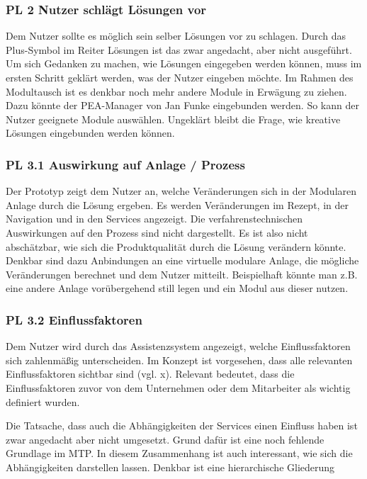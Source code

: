 \subsubsection*{PL 2 Nutzer schlägt Lösungen vor}
Dem Nutzer sollte es möglich sein selber Lösungen vor zu schlagen. Durch das Plus-Symbol im Reiter Lösungen ist das zwar angedacht, aber nicht ausgeführt. Um sich Gedanken zu machen, wie Lösungen eingegeben werden können, muss im ersten Schritt geklärt werden, was der Nutzer eingeben möchte. Im Rahmen des Modultausch ist es denkbar noch mehr andere Module in Erwägung zu ziehen. Dazu könnte der PEA-Manager von Jan Funke \cite{Funke2018} eingebunden werden. So kann der Nutzer geeignete Module auswählen. Ungeklärt bleibt die Frage, wie kreative Lösungen eingebunden werden können. 

\subsubsection*{PL 3.1 Auswirkung auf Anlage / Prozess}
Der Prototyp zeigt dem Nutzer an, welche Veränderungen sich in der Modularen Anlage durch die Lösung ergeben. Es werden Veränderungen im Rezept, in der Navigation und in den Services angezeigt. Die verfahrenstechnischen Auswirkungen auf den Prozess sind nicht dargestellt. Es ist also nicht abschätzbar, wie sich die Produktqualität durch die Lösung verändern könnte. Denkbar sind dazu Anbindungen an eine virtuelle modulare Anlage, die mögliche Veränderungen berechnet und dem Nutzer mitteilt. Beispielhaft könnte man z.B. eine andere Anlage vorübergehend still legen und ein Modul aus dieser nutzen.

\subsubsection*{PL 3.2 Einflussfaktoren}
Dem Nutzer wird durch das Assistenzsystem angezeigt, welche Einflussfaktoren sich zahlenmäßig unterscheiden. Im Konzept ist vorgesehen, dass alle relevanten Einflussfaktoren sichtbar sind (vgl. x). Relevant bedeutet, dass die Einflussfaktoren zuvor von dem Unternehmen oder dem Mitarbeiter als wichtig definiert wurden.

Die Tatsache, dass auch die Abhängigkeiten der Services einen Einfluss haben ist zwar angedacht aber nicht umgesetzt. Grund dafür ist eine noch fehlende Grundlage im MTP. In diesem Zusammenhang ist auch interessant, wie sich die Abhängigkeiten darstellen lassen. Denkbar ist eine hierarchische Gliederung 

